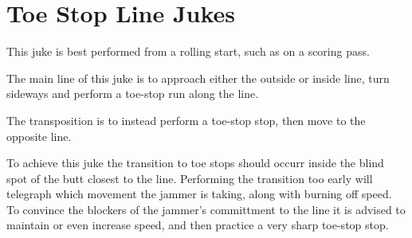 \section{Toe Stop Line Jukes}

This juke is best performed from a rolling start, such as on a scoring pass. 


The main line of this juke is to approach either the outside or inside line, turn sideways and perform a toe-stop run along the line.   

The transposition is to instead perform a toe-stop stop, then move to the opposite line.  


To achieve this juke the transition to toe stops should occurr inside the blind spot of the butt closest to the line.  
Performing the transition too early will telegraph which movement the jammer is taking, along with burning off speed. 
To convince the blockers of the jammer's committment to the line it is advised to maintain or even increase speed, and then practice a very sharp toe-stop stop.     
